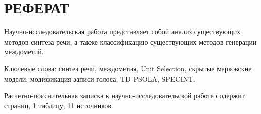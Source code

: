 \chapter*{\hfill РЕФЕРАТ \hfill}
\setcounter{page}{3}

Научно-исследовательская работа представляет собой анализ существующих методов синтеза речи, а также классификацию существующих методов генерации междометий.

Ключевые слова: синтез речи, междометия, Unit Selection, скрытые марковские модели, модификация записи голоса, TD-PSOLA, SPECINT.

Расчетно-пояснительная записка к научно-исследовательской работе содержит \pageref{LastPage} страниц, 1 таблицу, 11 источников.